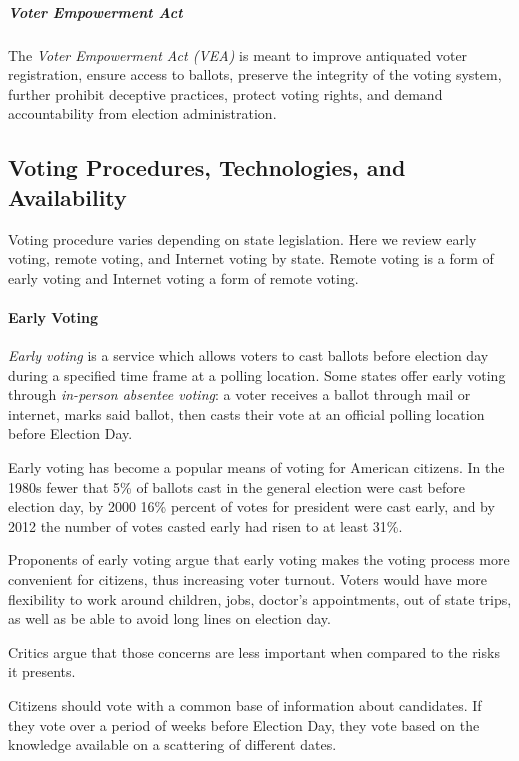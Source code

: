\subparagraph{Voter Empowerment Act}
The \emph{Voter Empowerment Act (VEA)} is meant to improve antiquated voter
registration, ensure access to ballots, preserve the integrity of the voting
system, further prohibit deceptive practices, protect voting rights, and demand
accountability from election administration.

\subsection{Voting Procedures, Technologies, and Availability}
Voting procedure varies depending on state legislation. Here we review early
voting, remote voting, and Internet voting by state. Remote voting is a form of
early voting and Internet voting a form of remote voting.

\paragraph{Early Voting}
\emph{Early voting} is a service which allows voters to cast ballots before
election day during a specified time frame at a polling location. Some states
offer early voting through \emph{in-person absentee voting}: a voter receives a
ballot through mail or internet, marks said ballot, then casts their vote at an
official polling location before Election Day.

Early voting has become a popular means of voting for American citizens. In the
1980s fewer that 5\% of ballots cast in the general election were cast before
election day, by 2000 16\% percent of votes for president were cast early, and
by 2012 the number of votes casted early had risen to at least 31\%.

Proponents of early voting argue that early voting makes the voting process more
convenient for citizens, thus increasing voter turnout. Voters would have more
flexibility to work around children, jobs, doctor's appointments, out of state
trips, as well as be able to avoid long lines on election day.

Critics argue that those concerns are less important when compared to the risks
it presents.

\begin{displayquote}
   Citizens should vote with a common base of information about candidates. If
   they vote over a period of weeks before Election Day, they vote based on the
   knowledge available on a scattering of different dates.
\end{displayquote}

